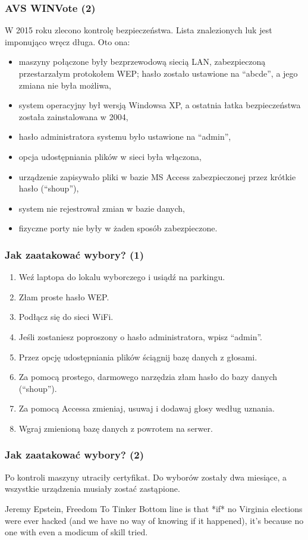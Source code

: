 \documentclass{beamer}
\begin{document}
\begin{frame}
\frametitle{AVS WINVote (2)}
W 2015 roku zlecono kontrolę bezpieczeństwa. Lista znalezionych luk jest imponująco wręcz długa. Oto ona: \pause
\begin{itemize}
\item maszyny połączone były bezprzewodową siecią LAN, zabezpieczoną przestarzałym protokołem WEP; hasło zostało ustawione na ``abcde'', a jego zmiana nie była możliwa, \pause
\item system operacyjny był wersją Windowsa XP, a ostatnia łatka bezpieczeństwa została zainstalowana w 2004, \pause
\item hasło administratora systemu było ustawione na ``admin'', \pause
\item opcja udostępniania plików w sieci była włączona, \pause
\item urządzenie zapisywało pliki w bazie MS Access zabezpieczonej przez krótkie hasło (``shoup''), \pause
\item system nie rejestrował zmian w bazie danych, \pause
\item fizyczne porty nie były w żaden sposób zabezpieczone. 
\end{itemize}
\end{frame}

\begin{frame}
\frametitle{Jak zaatakować wybory? (1)} \pause
\begin{enumerate}
\item Weź laptopa do lokalu wyborczego i usiądź na parkingu. \pause
\item Złam proste hasło WEP. \pause
\item Podłącz się do sieci WiFi. \pause
\item Jeśli zostaniesz poproszony o hasło administratora, wpisz ``admin''. \pause
\item Przez opcję udostępniania plików ściągnij bazę danych z głosami. \pause
\item Za pomocą prostego, darmowego narzędzia złam hasło do bazy danych (``shoup''). \pause
\item Za pomocą Accessa zmieniaj, usuwaj i dodawaj głosy według uznania. \pause
\item Wgraj zmienioną bazę danych z powrotem na serwer. 
\end{enumerate}
\end{frame}

\begin{frame}
\frametitle{Jak zaatakować wybory? (2)}
Po kontroli maszyny utraciły certyfikat. Do wyborów zostały dwa miesiące, a wszystkie urządzenia musiały zostać zastąpione. \pause
\begin{block}{Jeremy Epstein, Freedom To Tinker}
Bottom line is that *if* no Virginia elections were ever hacked (and we have no way of knowing if it happened), it’s because no one with even a modicum of skill tried.
\end{block}
\end{frame}
\end{document}
